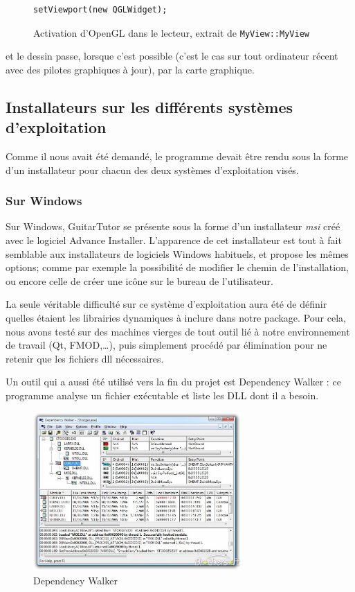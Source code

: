 \begin{figure}[H]
\begin{lstlisting}
setViewport(new QGLWidget);
\end{lstlisting}
\caption{Activation d'OpenGL dans le lecteur, extrait de \texttt{MyView::MyView}}
\label{player_opengl}
\end{figure}

et le dessin passe, lorsque c'est possible (c'est le cas sur tout ordinateur récent avec des pilotes graphiques à jour), par la carte graphique.

\subsection{Installateurs sur les différents systèmes d'exploitation}

Comme il nous avait été demandé, le programme devait être rendu sous la forme d'un installateur pour chacun des deux systèmes d'exploitation visés.

\subsubsection{Sur Windows}

Sur Windows, GuitarTutor se présente sous la forme d'un installateur \textit{msi} créé avec le logiciel Advance Installer. L'apparence de cet installateur est tout à fait semblable aux installateurs de logiciels Windows habituels, et propose les mêmes options; comme par exemple la possibilité de modifier le chemin de l'installation, ou encore celle de créer une icône sur le bureau de l'utilisateur.

La seule véritable difficulté sur ce système d'exploitation aura été de définir quelles étaient les librairies dynamiques à inclure dans notre package. Pour cela, nous avons testé sur des machines vierges de tout outil lié à notre environnement de travail (Qt, FMOD,\dots), puis simplement procédé par élimination pour ne retenir que les fichiers dll nécessaires.

Un outil qui a aussi été utilisé vers la fin du projet est Dependency Walker : ce programme analyse un fichier exécutable et liste les
DLL dont il a besoin.

\begin{figure}[H]
\begin{center}
\includegraphics[width=300px]{depwalker.jpeg}
\caption{Dependency Walker}
\label{dep_walker}
\end{center}
\end{figure}

